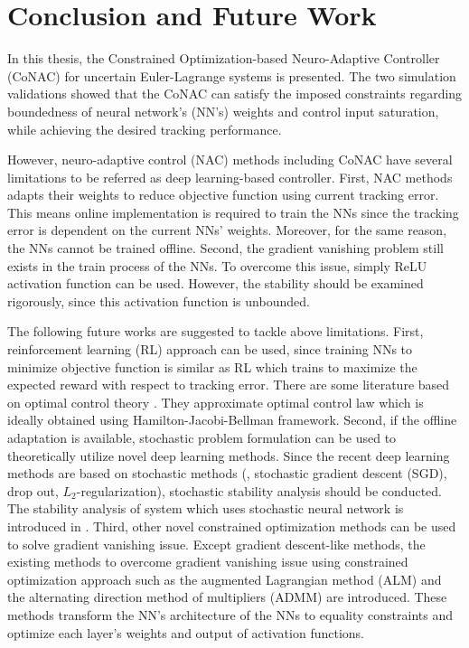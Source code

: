 
\chapter{Conclusion and Future Work} \label{chapter5}

In this thesis, the Constrained Optimization-based Neuro-Adaptive Controller (Co\allowbreak NAC) for uncertain Euler-Lagrange systems is presented. 
The two simulation validations showed that the CoNAC can satisfy the imposed constraints regarding boundedness of neural network's (NN's) weights and control input saturation, while achieving the desired tracking performance.

However, neuro-adaptive control (NAC) methods including CoNAC have several limitations to be referred as deep learning-based controller.
First, NAC methods adapts their weights to reduce objective function using current tracking error. 
This means online implementation is required to train the NNs since the tracking error is dependent on the current NNs' weights.
Moreover, for the same reason, the NNs cannot be trained offline.
Second, the gradient vanishing problem still exists in the train process of the NNs.
To overcome this issue, simply ReLU activation function can be used.
However, the stability should be examined rigorously, since this activation function is unbounded.

The following future works are suggested to tackle above limitations.
First, reinforcement learning (RL) approach can be used, since training NNs to minimize objective function is similar as RL which trains to maximize the expected reward with respect to tracking error.
There are some literature based on optimal control theory \cite{RN119,RN120,RN121}.
They approximate optimal control law which is ideally obtained using Hamilton-Jacobi-Bellman framework.
Second, if the offline adaptation is available, stochastic problem formulation can be used to theoretically utilize novel deep learning methods.
Since the recent deep learning methods are based on stochastic methods (\eg, stochastic gradient descent (SGD), drop out, $L_2$-regularization), stochastic stability analysis should be conducted.
The stability analysis of system which uses stochastic neural network is introduced in \cite{RN122,RN123}.
Third, other novel constrained optimization methods can be used to solve gradient vanishing issue.
Except gradient descent-like methods, the existing methods to overcome gradient vanishing issue using constrained optimization approach such as the augmented Lagrangian method (ALM) \cite{RN62} and the alternating direction method of multipliers (ADMM) \cite{RN98, RN94} are introduced.
These methods transform the NN's architecture of the NNs to equality constraints and optimize each layer's weights and output of activation functions.


